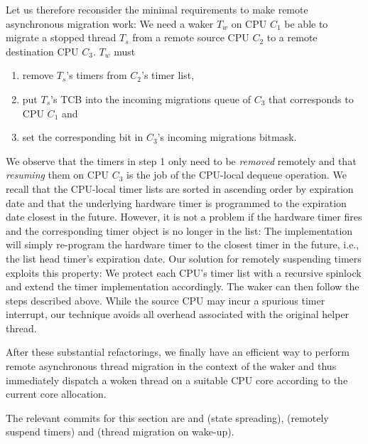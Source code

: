 \documentclass[12pt,a4paper]{book}
\begin{document}
Let us therefore reconsider the minimal requirements to make remote asynchronous migration work:
We need a waker $T_w$ on CPU $C_1$ be able to migrate a stopped thread $T_s$ from a remote source CPU $C_2$ to a remote destination CPU $C_3$. $T_w$ must
\begin{enumerate}
    \item remove $T_s$'s timers from $C_2$'s timer list,
    \item put $T_s$'s TCB into the incoming migrations queue of $C_3$ that corresponds to CPU $C_1$ and
    \item set the corresponding bit in $C_3$'s incoming migrations bitmask.
\end{enumerate}
We observe that the timers in step 1 only need to be \emph{removed} remotely and that \emph{resuming} them on CPU $C_3$ is the job of the CPU-local dequeue operation.
We recall that the CPU-local timer lists are sorted in ascending order by expiration date and that the underlying hardware timer is programmed to the expiration date closest in the future.
However, it is not a problem if the hardware timer fires and the corresponding timer object is no longer in the list:
The implementation will simply re-program the hardware timer to the closest timer in the future, i.e., the list head timer's expiration date.
Our solution for remotely suspending timers exploits this property:
We protect each CPU's timer list with a recursive spinlock and extend the timer implementation accordingly.
The waker can then follow the steps described above.
While the source CPU may incur a spurious timer interrupt, our technique avoids all overhead associated with the original helper thread.

After these substantial refactorings, we finally have an efficient way to perform remote asynchronous thread migration in the context of the waker and thus immediately dispatch a woken thread on a suitable CPU core according to the current core allocation.

The relevant commits for this section are  and  (state spreading),  (remotely suspend timers) and  (thread migration on wake-up).
\end{document}
